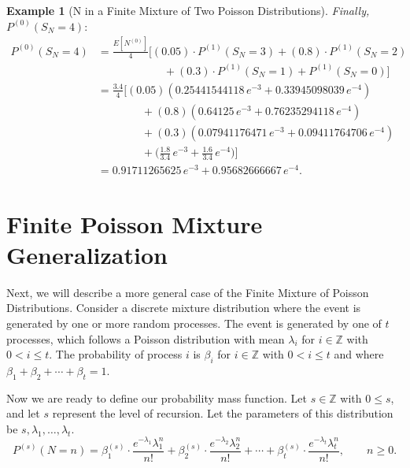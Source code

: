 \documentclass[11pt]{amsart}
\theoremstyle{definition}
\newtheorem{example}{Example}
\theoremstyle{plain}
\begin{document}
\begin{example}[N in a Finite Mixture of Two Poisson Distributions]
\medskip
\noindent\textit{Finally,} $P^{(0)}(S_N = 4)$:
\begin{align*}
P^{(0)}(S_N = 4)
    &= \frac{E[N^{(0)}]}{4}
       \bigl[(0.05)\cdot P^{(1)}(S_N = 3) + (0.8)\cdot P^{(1)}(S_N = 2) \\
    &\qquad\qquad\qquad + (0.3)\cdot P^{(1)}(S_N = 1)
       + P^{(1)}(S_N = 0)\bigr] \\
    &= \frac{3.4}{4}
       \bigl[(0.05)(0.25441544118\,e^{-3} + 0.33945098039\,e^{-4}) \\
    &\qquad\qquad + (0.8)(0.64125\,e^{-3} + 0.76235294118\,e^{-4}) \\
    &\qquad\qquad + (0.3)(0.07941176471\,e^{-3} + 0.09411764706\,e^{-4}) \\
    &\qquad\qquad + \bigl(\tfrac{1.8}{3.4}\,e^{-3} + \tfrac{1.6}{3.4}\,e^{-4}\bigr)\bigr] \\
    &= \boxed{0.91711265625\,e^{-3} + 0.95682666667\,e^{-4}}.
\end{align*}
\end{example}

\section{Finite Poisson Mixture Generalization}

Next, we will describe a more general case of the Finite Mixture of Poisson Distributions.
Consider a discrete mixture distribution where the event is generated by one or more random
processes.  The event is generated by one of $t$ processes, which follows a Poisson
distribution with mean $\lambda_i$ for $i \in \mathbb{Z}$ with $0 < i \leq t$.  The
probability of process $i$ is $\beta_i$ for $i \in \mathbb{Z}$ with $0 < i \leq t$ and
where $\beta_1 + \beta_2 + \cdots + \beta_t = 1$.

Now we are ready to define our probability mass function.  Let $s \in \mathbb{Z}$ with
$0 \leq s$, and let $s$ represent the level of recursion.  Let the parameters of this
distribution be $s, \lambda_1, \ldots, \lambda_t$.
\[
    P^{(s)}(N = n)
    = \beta_1^{(s)} \cdot \frac{e^{-\lambda_1}\lambda_1^n}{n!}
    + \beta_2^{(s)} \cdot \frac{e^{-\lambda_2}\lambda_2^n}{n!}
    + \cdots
    + \beta_t^{(s)} \cdot \frac{e^{-\lambda_t}\lambda_t^n}{n!},
    \qquad n \geq 0.
\]
\end{document}
